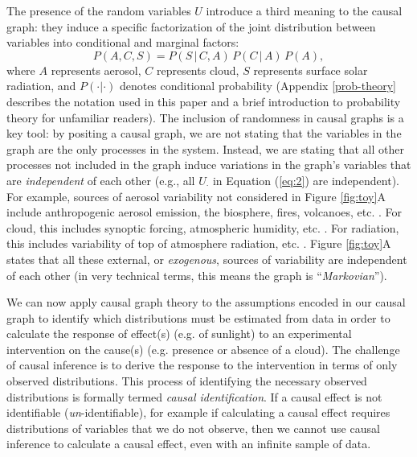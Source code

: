 \documentclass[12pt]{article}
\begin{document}
The presence of the random variables $U$ introduce a third meaning to
the causal graph: they induce a specific factorization of the joint
distribution between variables into conditional and marginal factors:
\begin{equation}
  P(A, C, S) = P(S \, | \,C, A) \, P(C \, | \, A) \, P(A),
\end{equation}
where $A$ represents aerosol, $C$ represents cloud, $S$ represents
surface solar radiation, and $P(\cdot | \cdot)$ denotes conditional
probability (Appendix \ref{prob-theory} describes the notation used in
this paper and a brief introduction to probability theory for
unfamiliar readers). The inclusion of randomness in causal graphs is a
key tool: by positing a causal graph, we are not stating that the
variables in the graph are the only processes in the system. Instead,
we are stating that all other processes not included in the graph
induce variations in the graph's variables that are \emph{independent} of
each other (e.g., all $U_{\cdot}$ in Equation (\ref{eq:2}) are
independent). For example, sources of aerosol variability not
considered in Figure \ref{fig:toy}A include anthropogenic aerosol
emission, the biosphere, fires, volcanoes,
etc. \citep[e.g.,][]{Boucher2015}. For cloud, this includes synoptic
forcing, atmospheric humidity,
etc. \citep[e.g.,][]{wallace2006atmospheric}. For radiation, this
includes variability of top of atmosphere radiation,
etc. \citep[e.g.,][]{hartmann2015global}. Figure \ref{fig:toy}A states
that all these external, or \textit{exogenous}, sources of variability
are independent of each other (in very technical terms, this means the
graph is ``\textit{Markovian}'').

We can now apply causal graph theory
\citep[e.g.,][]{pearl1995causal,shpitser2006} to the assumptions
encoded in our causal graph to identify which distributions must be
estimated from data in order to calculate the response of effect(s)
(e.g. of sunlight) to an experimental intervention on the cause(s)
(e.g. presence or absence of a cloud). The challenge of causal
inference is to derive the response to the intervention in terms of
only observed distributions. This process of identifying the necessary
observed distributions is formally termed \emph{causal
  identification}. If a causal effect is not identifiable
(\emph{un}-identifiable), for example if calculating a causal effect
requires distributions of variables that we do not observe, then we
cannot use causal inference to calculate a causal effect, even with an
infinite sample of data.
\end{document}

